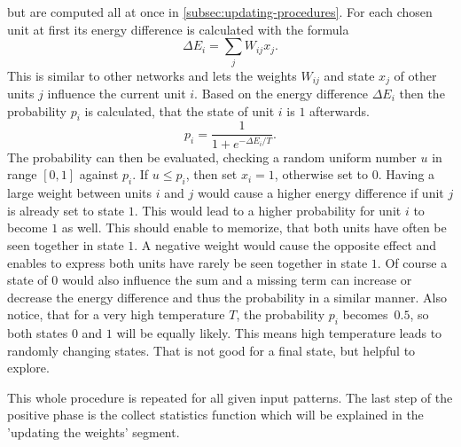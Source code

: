 \documentclass[12pt,twoside]{article}
\theoremstyle{plain}
\theoremstyle{definition}
\theoremstyle{remark}
\begin{document}
\begin{enumerate}
        but are computed all at once in \cref{subsec:updating-procedures}.\newline
        For each chosen unit at first its energy difference is calculated with the formula
        $$\Delta E_i = \sum_j W_{ij} x_j.$$
        This is similar to other networks and lets the weights $W_{ij}$ and state $x_j$ of other units $j$ influence the current unit $i$. 
        Based on the energy difference $\Delta E_i$ then the probability $p_i$ is calculated, that the state of unit $i$ is $1$ afterwards.
        $$p_i = \frac{1}{1+e^{-\Delta E_i / T}}.$$
        The probability can then be evaluated, checking a random uniform number $u$ in range $[0, 1]$ against $p_i$.
        If $u \leq p_i$, then set $x_i = 1$, otherwise set to $0$.\newline
        Having a large weight between units $i$ and $j$ would cause a higher energy difference if unit $j$ is already set to state $1$.
        This would lead to a higher probability for unit $i$ to become $1$ as well. This should enable to memorize, that both units have often be seen together
        in state $1$. A negative weight would cause the opposite effect and enables to express both units have rarely be seen together in state $1$.
        Of course a state of $0$ would also influence the sum and a missing term can increase or decrease the energy difference and thus the probability in 
        a similar manner.\newline
        Also notice, that for a very high temperature $T$, the probability $p_i$ becomes~$0.5$, so both states $0$ and $1$ will be equally likely.
        This means high temperature leads to randomly changing states. That is not good for a final state, but helpful to explore.
        

        This whole procedure is repeated for all given input patterns. The last step of the positive phase is the collect statistics function which will be explained in
        the 'updating the weights' segment.



\end{enumerate}
\end{document}

